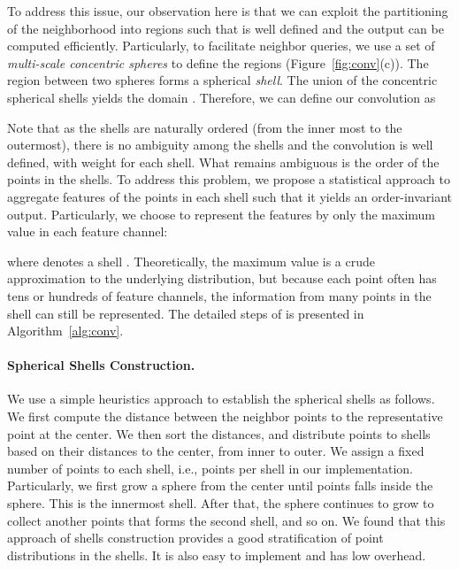 \documentclass[10pt,twocolumn,letterpaper]{article}
\begin{document}
To address this issue, our observation here is that we can exploit the partitioning of the neighborhood into regions such that  is well defined and the output can be computed efficiently. Particularly, to facilitate neighbor queries, we use a set of \emph{multi-scale concentric spheres} to define the regions (Figure~\ref{fig:conv}(c)). The region between two spheres forms a spherical \emph{shell}. The union of the concentric spherical shells yields the domain .
Therefore, we can define our convolution as

Note that as the shells are naturally ordered (from the inner most to the outermost), there is no ambiguity among the shells and the convolution is well defined, with weight  for each shell. What remains ambiguous is the order of the points in the shells. 
To address this problem, we propose a statistical approach to aggregate features of the points in each shell such that it yields an order-invariant output. Particularly, we choose to represent the features by only the maximum value in each feature channel:

where  denotes a shell .
Theoretically, the maximum value is a crude approximation to the underlying distribution, but because each point often has tens or hundreds of feature channels, the information from many points in the shell can still be represented.
The detailed steps of \ourconv is presented in Algorithm~\ref{alg:conv}. 

\paragraph{Spherical Shells Construction.} We use a simple heuristics approach to establish the spherical shells as follows. We first compute the distance between the neighbor points to the representative point at the center. We then sort the distances, and distribute points to shells based on their distances to the center, from inner to outer. We assign a fixed number of points to each shell, i.e.,  points per shell in our implementation. Particularly, we first grow a sphere from the center until  points falls inside the sphere. This is the innermost shell. After that, the sphere continues to grow to collect another  points that forms the second shell, and so on. 
We found that this approach of shells construction provides a good stratification of point distributions in the shells. It is also easy to implement and has low overhead. 
\end{document}
